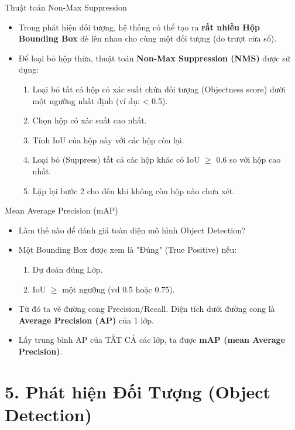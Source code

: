 \documentclass[aspectratio=169]{beamer}
\begin{document}
\begin{frame}{Thuật toán Non-Max Suppression}
    \begin{itemize}
        \item Trong phát hiện đối tượng, hệ thống có thể tạo ra \textbf{rất nhiều Hộp Bounding Box} đè lên nhau cho cùng một đối tượng (do trượt cửa sổ).
        \item Để loại bỏ hộp thừa, thuật toán \textbf{Non-Max Suppression (NMS)} được sử dụng:
        \begin{enumerate}
            \item Loại bỏ tất cả hộp có xác suất chứa đối tượng (Objectness score) dưới một ngưỡng nhất định (ví dụ: < 0.5).
            \item Chọn hộp có xác suất cao nhất.
            \item Tính IoU của hộp này với các hộp còn lại.
            \item Loại bỏ (Suppress) tất cả các hộp khác có IoU $\ge$ 0.6 so với hộp cao nhất.
            \item Lặp lại bước 2 cho đến khi không còn hộp nào chưa xét.
        \end{enumerate}
    \end{itemize}
\end{frame}

\begin{frame}{Mean Average Precision (mAP)}
    \begin{itemize}
        \item Làm thế nào để đánh giá toàn diện mô hình Object Detection?
        \item Một Bounding Box được xem là "Đúng" (True Positive) nếu: 
            \begin{enumerate}
                \item Dự đoán đúng Lớp.
                \item IoU $\ge$ một ngưỡng (vd 0.5 hoặc 0.75).
            \end{enumerate}
        \item Từ đó ta vẽ đường cong Precision/Recall. Diện tích dưới đường cong là \textbf{Average Precision (AP)} của 1 lớp.
        \item Lấy trung bình AP của TẤT CẢ các lớp, ta được \textbf{mAP (mean Average Precision)}.
    \end{itemize}
\end{frame}

\section{5. Phát hiện Đối Tượng (Object Detection)}
\end{document}
